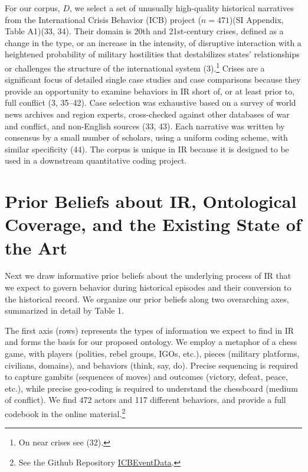 \documentclass{article}
\begin{document}
For our corpus, \(D\), we select a set of unusually high-quality
historical narratives from the International Crisis Behavior (ICB)
project (\(n=471\))(SI Appendix, Table A1)(33, 34). Their domain is 20th
and 21st-century crises, defined as a change in the type, or an increase
in the intensity, of disruptive interaction with a heightened
probability of military hostilities that destabilizes states'
relationships or challenges the structure of the international system
(3).\footnote{On near crises see (32).} Crises are a significant focus
of detailed single case studies and case comparisons because they
provide an opportunity to examine behaviors in IR short of, or at least
prior to, full conflict (3, 35--42). Case selection was exhaustive based
on a survey of world news archives and region experts, cross-checked
against other databases of war and conflict, and non-English sources
(33, 43). Each narrative was written by consensus by a small number of
scholars, using a uniform coding scheme, with similar specificity (44).
The corpus is unique in IR because it is designed to be used in a
downstream quantitative coding project.

\hypertarget{prior-beliefs-about-ir-ontological-coverage-and-the-existing-state-of-the-art}{%
\section*{Prior Beliefs about IR, Ontological Coverage, and the Existing
State of the
Art}\label{prior-beliefs-about-ir-ontological-coverage-and-the-existing-state-of-the-art}}

Next we draw informative prior beliefs about the underlying process of
IR that we expect to govern behavior during historical episodes and
their conversion to the historical record. We organize our prior beliefs
along two overarching axes, summarized in detail by Table 1.

The first axis (rows) represents the types of information we expect to
find in IR and forms the basis for our proposed ontology. We employ a
metaphor of a chess game, with players (polities, rebel groups, IGOs,
etc.), pieces (military platforms, civilians, domains), and behaviors
(think, say, do). Precise sequencing is required to capture gambits
(sequences of moves) and outcomes (victory, defeat, peace, etc.), while
precise geo-coding is required to understand the chessboard (medium of
conflict). We find 472 actors and 117 different behaviors, and provide a
full codebook in the online material.\footnote{See the Github Repository
  \href{https://urldefense.com/v3/__https://github.com/CenterForPeaceAndSecurityStudies/ICBEventData__;!!Mih3wA!WxDJtEczKfxGTh0S2Krunap8ReymFEL5iTWaSfOHeqlSdyfRx77zmjBSWO1OAm13$}{ICBEventData}.}
\end{document}
